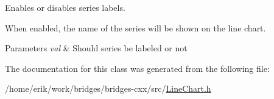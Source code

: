Enables or disables series labels. 

When enabled, the name of the series will be shown on the line chart.


\begin{DoxyParams}{Parameters}
{\em val} & Should series be labeled or not \\
\hline
\end{DoxyParams}


The documentation for this class was generated from the following file\+:\begin{DoxyCompactItemize}
\item 
/home/erik/work/bridges/bridges-\/cxx/src/\hyperlink{_line_chart_8h}{Line\+Chart.\+h}\end{DoxyCompactItemize}
